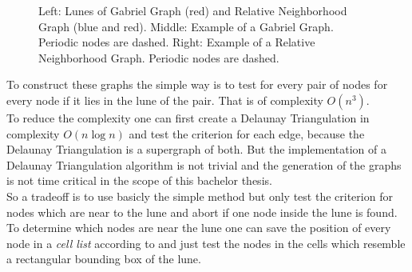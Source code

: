     \begin{figure}[htbp]
        \centering
        \subfigure{}
        \caption[Definition of the lunes and examples of the Gabriel
                and Relative Neighborhood Graph]
                {Left: Lunes of Gabriel Graph (red) and Relative
                    Neighborhood Graph (blue and red). Middle:
                    Example of a Gabriel Graph. Periodic nodes are
                    dashed. Right: Example of a Relative
                    Neighborhood Graph. Periodic nodes are dashed.}
        \label{fig:lunes}
    \end{figure}

    To construct these graphs the simple way is to test for every
    pair of nodes for every node if it lies in the lune of the pair.
    That is of complexity \(O (n^3)\).\\
    To reduce the complexity one can first create a Delaunay
    Triangulation in complexity \(O (n \log n)\)
    \cite{Leach1992} and test the criterion for each edge, because
    the Delaunay Triangulation is a supergraph of both. But the
    implementation of a Delaunay Triangulation algorithm is not
    trivial and the generation of the graphs is not time critical in
    the scope of this bachelor thesis.\\
    So a tradeoff is to use basicly the simple method but only test
    the criterion for nodes which are near to the lune and abort if
    one node inside the lune is found. To determine which nodes are
    near the lune one can save the position of every node in a
    \emph{cell list} according to \cite{RNGCell} and just test the
    nodes in the cells which resemble a rectangular bounding box of the
    lune.

